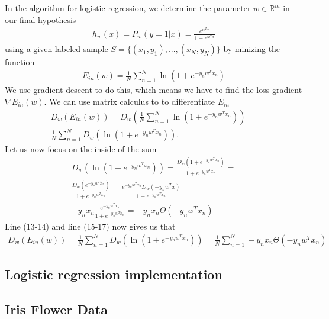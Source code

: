 In the algorithm for logistic regression, we determine the parameter $w \in \mathbb{R}^m$ in our final hypothesis
\begin{align}
h_w(x) = P_w(y = 1|x) = \frac{e^{w^Tx}}{1 + e^{w^Tx}}
\end{align}
using a given labeled sample $S = \{(x_1,y_1),...,(x_N,y_N)\}$ by minizing the function
\begin{align}
E_{in}(w) = \frac{1}{N} \sum_{n=1}^N \ln(1 + e^{-y_n w^T x_n})
\end{align}
We use gradient descent to do this, which means we have to find the loss gradient $\nabla E_{in}(w)$. We can use matrix calculus to to differentiate $E_{in}$
\begin{align}
D_w (E_{in}(w)) = D_w\left( \frac{1}{N} \sum_{n=1}^N \ln(1 + e^{-y_n w^T x_n}) \right) = \\ 
 \frac{1}{N} \sum_{n=1}^N D_w \left( \ln(1 + e^{-y_n w^T x_n}) \right). 
\end{align}
Let us now focus on the inside of the sum
\begin{align}
D_w \left( \ln(1 + e^{-y_n w^T x_n}) \right) = \frac{D_w ( 1 + e^{-y_n w^T x_n})}{1 + e^{-y_n w^T x_n}} = \\ 
\frac{D_w (e^{-y_n w^T x_n})}{1 + e^{-y_n w^T x_n}} =
\frac{e^{-y_n w^T x_n} D_w(-y_nw^Tx)}{1 + e^{-y_n w^T x_n}} = \\ 
-y_n x_n \frac{e^{-y_n w^T x_n}}{1 + e^{-y_n w^T x_n}} = -y_n x_n \Theta(-y_n w^T x_n)
\end{align}
Line (13-14) and line (15-17) now gives us that
\begin{align}
D_w (E_{in}(w)) =  \frac{1}{N} \sum_{n=1}^N D_w \left( \ln(1 + e^{-y_n w^T x_n}) \right) =
\frac{1}{N} \sum_{n=1}^N  -y_n x_n \Theta(-y_n w^T x_n) 
\end{align}



\subsection{Logistic regression implementation}


\subsection{Iris Flower Data}

